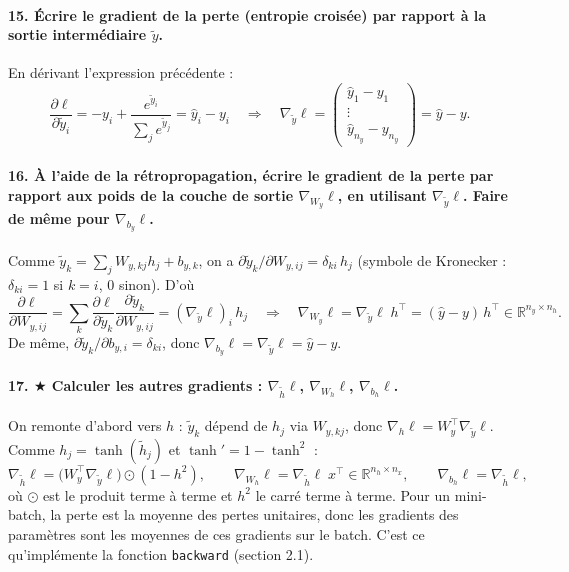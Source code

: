 \documentclass{report}
\begin{document}
\paragraph{15. Écrire le gradient de la perte (entropie croisée) par rapport à la sortie intermédiaire $\tilde{y}$.}
En dérivant l'expression précédente :
\begin{equation*}
    \frac{\partial \ell}{\partial \tilde{y}_i} = -y_i + \frac{e^{\tilde{y}_i}}{\sum_j e^{\tilde{y}_j}} = \hat{y}_i - y_i
    \quad \Longrightarrow \quad
    \nabla_{\tilde{y}} \ell = \begin{pmatrix} \hat{y}_1 - y_1 \\ \vdots \\ \hat{y}_{n_y} - y_{n_y} \end{pmatrix} = \hat{y} - y.
\end{equation*}

\paragraph{16. À l'aide de la rétropropagation, écrire le gradient de la perte par rapport aux poids de la couche de sortie $\nabla_{W_y} \ell$, en utilisant $\nabla_{\tilde{y}} \ell$. Faire de même pour $\nabla_{b_y} \ell$.}
Comme $\tilde{y}_k = \sum_j W_{y,kj} h_j + b_{y,k}$, on a $\partial \tilde{y}_k / \partial W_{y,ij} = \delta_{ki}\, h_j$ (symbole de Kronecker : $\delta_{ki} = 1$ si $k = i$, $0$ sinon). D'où
\begin{equation*}
    \frac{\partial \ell}{\partial W_{y,ij}} = \sum_k \frac{\partial \ell}{\partial \tilde{y}_k} \frac{\partial \tilde{y}_k}{\partial W_{y,ij}} = (\nabla_{\tilde{y}} \ell)_i \, h_j
    \quad \Longrightarrow \quad
    \nabla_{W_y} \ell = \nabla_{\tilde{y}} \ell \; h^\top = (\hat{y} - y)\, h^\top \in \mathbb{R}^{n_y \times n_h}.
\end{equation*}
De même, $\partial \tilde{y}_k / \partial b_{y,i} = \delta_{ki}$, donc $\nabla_{b_y} \ell = \nabla_{\tilde{y}} \ell = \hat{y} - y$.

\paragraph{17. $\bigstar$ Calculer les autres gradients : $\nabla_{\tilde{h}} \ell$, $\nabla_{W_h} \ell$, $\nabla_{b_h} \ell$.}
On remonte d'abord vers $h$ : $\tilde{y}_k$ dépend de $h_j$ via $W_{y,kj}$, donc $\nabla_h \ell = W_y^\top \nabla_{\tilde{y}} \ell$. Comme $h_j = \tanh(\tilde{h}_j)$ et $\tanh' = 1 - \tanh^2$ :
\begin{equation*}
    \nabla_{\tilde{h}} \ell = \big(W_y^\top \nabla_{\tilde{y}} \ell\big) \odot (1 - h^2), \qquad
    \nabla_{W_h} \ell = \nabla_{\tilde{h}} \ell \; x^\top \in \mathbb{R}^{n_h \times n_x}, \qquad
    \nabla_{b_h} \ell = \nabla_{\tilde{h}} \ell,
\end{equation*}
où $\odot$ est le produit terme à terme et $h^2$ le carré terme à terme. Pour un mini-batch, la perte est la moyenne des pertes unitaires, donc les gradients des paramètres sont les moyennes de ces gradients sur le batch. C'est ce qu'implémente la fonction \texttt{backward} (section 2.1).
\end{document}
